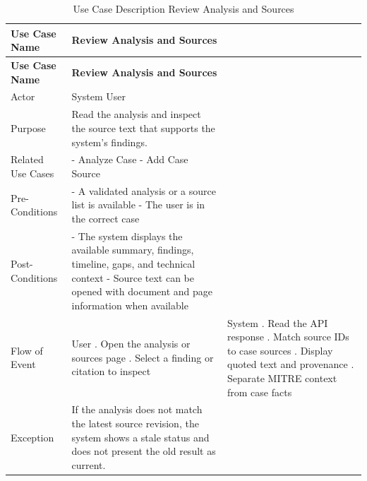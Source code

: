 \begin{longtable}{@{}>{\raggedright\arraybackslash}p{} >{\raggedright\arraybackslash}p{} >{\raggedright\arraybackslash}p{}@{}}
\caption{Use Case Description Review Analysis and Sources}\label{tab:3-7}\\
\toprule
\textbf{Use Case Name} & \textbf{Review Analysis and Sources} & \textbf{} \\
\midrule
\endfirsthead
\textbf{Use Case Name} & \textbf{Review Analysis and Sources} & \textbf{} \\
\midrule
\endhead
Actor & System User &  \\
Purpose & Read the analysis and inspect the source text that supports the system's findings. &  \\
Related Use Cases & - Analyze Case \newline - Add Case Source &  \\
Pre-Conditions & - A validated analysis or a source list is available \newline - The user is in the correct case &  \\
Post-Conditions & - The system displays the available summary, findings, timeline, gaps, and technical context \newline - Source text can be opened with document and page information when available &  \\
Flow of Event & User \newline 1. Open the analysis or sources page \newline 2. Select a finding or citation to inspect & System \newline 1. Read the API response \newline 2. Match source IDs to case sources \newline 3. Display quoted text and provenance \newline 4. Separate MITRE context from case facts \\
Exception & If the analysis does not match the latest source revision, the system shows a stale status and does not present the old result as current. &  \\
\bottomrule
\end{longtable}

